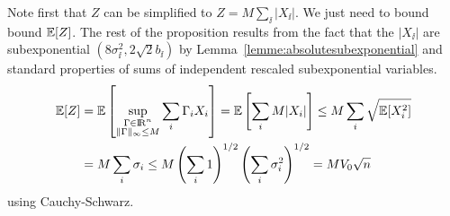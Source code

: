 \proofbegin
Note first that $Z$ can be simplified to $Z =  M \sum_{\ii} |X_{\ii}|$. We just need to bound bound $\mathbb{E}[Z]$. The rest of the proposition results from the fact that the $|X_{\ii}|$ are subexponential $(8\sigma_{\ii}^2, 2\sqrt{2}b_{\ii})$ by Lemma~\ref{lemme:absolutesubexponential} and standard properties of sums of independent rescaled subexponential variables. 
\begin{align*}
  \Esp[Z] & = \Esp \left[ \sup_{\substack{\Gamma \in \R^{\n} \\ \|\Gamma \|_{\infty} \leq M}}  \sum_{\ii} \Gamma_{\ii} X_{\ii} \right]  = \Esp \left[ \sum_{\ii} M |X_{\ii}| \right] \leq M \sum_{\ii} \sqrt{\Esp [ X_{\ii}^2 ]} \\ & 
  = M \sum_{\ii} \sigma_i \leq M \left( \sum_{\ii} 1 \right)^{1/2} \left( \sum_{\ii} \sigma_{\ii}^2 \right)^{1/2} = M V_0\sqrt{\n}
\end{align*}
using Cauchy-Schwarz. 
% 
% 
% 
% 
% 
% 
\proofend

